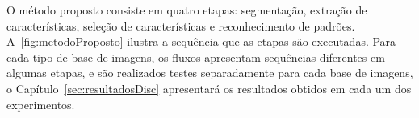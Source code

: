



O método proposto consiste em quatro etapas: segmentação, extração de características, seleção de características e reconhecimento de padrões. A~\autoref{fig:metodoProposto} ilustra a sequência que as etapas são executadas. Para cada tipo de base de imagens, os fluxos apresentam sequências diferentes em algumas etapas, e são realizados testes separadamente para cada base de imagens, o Capítulo~\ref{sec:resultadosDisc} apresentará os resultados obtidos em cada um dos experimentos.

